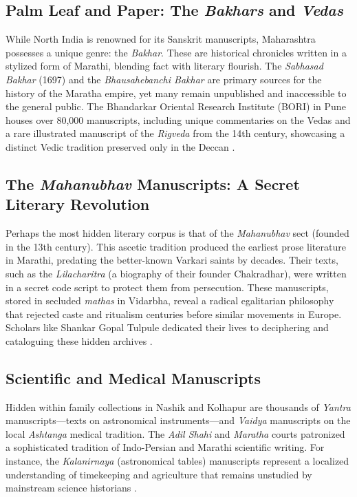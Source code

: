 \documentclass{article}
\begin{document}
\subsection{Palm Leaf and Paper: The \textit{Bakhars} and \textit{Vedas}}
While North India is renowned for its Sanskrit manuscripts, Maharashtra possesses a unique genre: the \textit{Bakhar}. These are historical chronicles written in a stylized form of Marathi, blending fact with literary flourish. The \textit{Sabhasad Bakhar} (1697) and the \textit{Bhausahebanchi Bakhar} are primary sources for the history of the Maratha empire, yet many remain unpublished and inaccessible to the general public. The Bhandarkar Oriental Research Institute (BORI) in Pune houses over 80,000 manuscripts, including unique commentaries on the Vedas and a rare illustrated manuscript of the \textit{Rigveda} from the 14th century, showcasing a distinct Vedic tradition preserved only in the Deccan \cite{bori}.

\subsection{The \textit{Mahanubhav} Manuscripts: A Secret Literary Revolution}
Perhaps the most hidden literary corpus is that of the \textit{Mahanubhav} sect (founded in the 13th century). This ascetic tradition produced the earliest prose literature in Marathi, predating the better-known Varkari saints by decades. Their texts, such as the \textit{Lilacharitra} (a biography of their founder Chakradhar), were written in a secret code script to protect them from persecution. These manuscripts, stored in secluded \textit{mathas} in Vidarbha, reveal a radical egalitarian philosophy that rejected caste and ritualism centuries before similar movements in Europe. Scholars like Shankar Gopal Tulpule dedicated their lives to deciphering and cataloguing these hidden archives \cite{tulpule}.

\subsection{Scientific and Medical Manuscripts}
Hidden within family collections in Nashik and Kolhapur are thousands of \textit{Yantra} manuscripts—texts on astronomical instruments—and \textit{Vaidya} manuscripts on the local \textit{Ashtanga} medical tradition. The \textit{Adil Shahi} and \textit{Maratha} courts patronized a sophisticated tradition of Indo-Persian and Marathi scientific writing. For instance, the \textit{Kalanirnaya} (astronomical tables) manuscripts represent a localized understanding of timekeeping and agriculture that remains unstudied by mainstream science historians \cite{kulkarni}.
\end{document}
